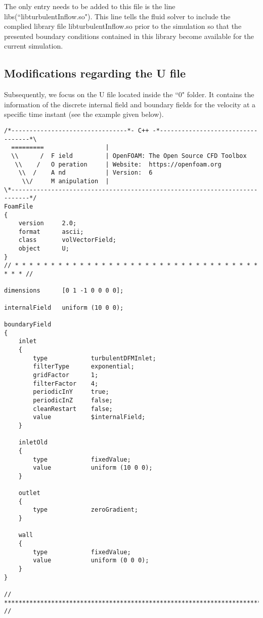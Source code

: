 \noindent The only entry needs to be added to this file is the line \textcolor{mauve}{libs(``libturbulentInflow.so")}. This line tells the fluid solver to include the complied library file \textcolor{mauve}{libturbulentInflow.so} prior to the simulation so that the presented boundary conditions contained in this library become available for the current simulation.

\subsection{Modifications regarding the \textcolor{mauve}{U} file}

Subsequently, we focus on the \textcolor{mauve}{U} file located inside the \textcolor{mauve}{``0"} folder. It contains the information of the discrete internal field and boundary fields for the velocity at a specific time instant (see the example given below).

\begin{lstlisting}
/*--------------------------------*- C++ -*----------------------------------*\
  =========                 |
  \\      /  F ield         | OpenFOAM: The Open Source CFD Toolbox
   \\    /   O peration     | Website:  https://openfoam.org
    \\  /    A nd           | Version:  6
     \\/     M anipulation  |
\*---------------------------------------------------------------------------*/
FoamFile
{
    version     2.0;
    format      ascii;
    class       volVectorField;
    object      U;
}
// * * * * * * * * * * * * * * * * * * * * * * * * * * * * * * * * * * * * * //

dimensions      [0 1 -1 0 0 0 0];

internalField   uniform (10 0 0);

boundaryField
{
    inlet
    {
        type            turbulentDFMInlet;
        filterType      exponential;
        gridFactor      1;
        filterFactor    4;
        periodicInY     true;
        periodicInZ     false;
        cleanRestart    false;
        value           $internalField;
    }
    
    inletOld
    {
        type            fixedValue;
        value           uniform (10 0 0);
    }

    outlet
    {
        type            zeroGradient;
    }

    wall
    {
        type            fixedValue;
        value           uniform (0 0 0);
    }
}

// ************************************************************************* //
\end{lstlisting}

